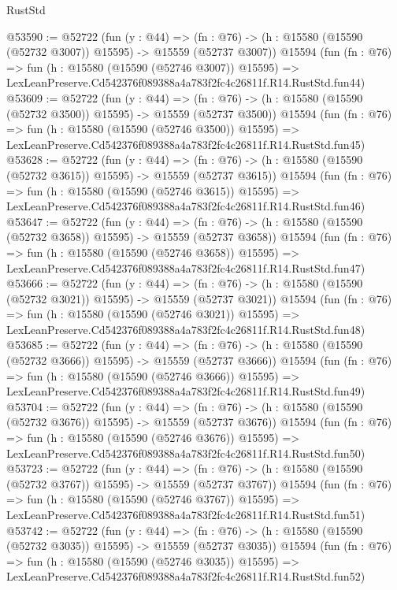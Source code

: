 \begin{lexlean}{RustStd}
\begin{coremodule}
@53590 := @52722
    (fun (y : @44) =>
    (fn : @76) -> (h : @15580 (@15590 (@52732 @3007)) @15595) -> @15559 (@52737 @3007))
    @15594
    (fun (fn : @76) =>
    fun (h : @15580 (@15590 (@52746 @3007)) @15595) =>
    LexLeanPreserve.Cd542376f089388a4a783f2fc4c26811f.R14.RustStd.fun44)
@53609 := @52722
    (fun (y : @44) =>
    (fn : @76) -> (h : @15580 (@15590 (@52732 @3500)) @15595) -> @15559 (@52737 @3500))
    @15594
    (fun (fn : @76) =>
    fun (h : @15580 (@15590 (@52746 @3500)) @15595) =>
    LexLeanPreserve.Cd542376f089388a4a783f2fc4c26811f.R14.RustStd.fun45)
@53628 := @52722
    (fun (y : @44) =>
    (fn : @76) -> (h : @15580 (@15590 (@52732 @3615)) @15595) -> @15559 (@52737 @3615))
    @15594
    (fun (fn : @76) =>
    fun (h : @15580 (@15590 (@52746 @3615)) @15595) =>
    LexLeanPreserve.Cd542376f089388a4a783f2fc4c26811f.R14.RustStd.fun46)
@53647 := @52722
    (fun (y : @44) =>
    (fn : @76) -> (h : @15580 (@15590 (@52732 @3658)) @15595) -> @15559 (@52737 @3658))
    @15594
    (fun (fn : @76) =>
    fun (h : @15580 (@15590 (@52746 @3658)) @15595) =>
    LexLeanPreserve.Cd542376f089388a4a783f2fc4c26811f.R14.RustStd.fun47)
@53666 := @52722
    (fun (y : @44) =>
    (fn : @76) -> (h : @15580 (@15590 (@52732 @3021)) @15595) -> @15559 (@52737 @3021))
    @15594
    (fun (fn : @76) =>
    fun (h : @15580 (@15590 (@52746 @3021)) @15595) =>
    LexLeanPreserve.Cd542376f089388a4a783f2fc4c26811f.R14.RustStd.fun48)
@53685 := @52722
    (fun (y : @44) =>
    (fn : @76) -> (h : @15580 (@15590 (@52732 @3666)) @15595) -> @15559 (@52737 @3666))
    @15594
    (fun (fn : @76) =>
    fun (h : @15580 (@15590 (@52746 @3666)) @15595) =>
    LexLeanPreserve.Cd542376f089388a4a783f2fc4c26811f.R14.RustStd.fun49)
@53704 := @52722
    (fun (y : @44) =>
    (fn : @76) -> (h : @15580 (@15590 (@52732 @3676)) @15595) -> @15559 (@52737 @3676))
    @15594
    (fun (fn : @76) =>
    fun (h : @15580 (@15590 (@52746 @3676)) @15595) =>
    LexLeanPreserve.Cd542376f089388a4a783f2fc4c26811f.R14.RustStd.fun50)
@53723 := @52722
    (fun (y : @44) =>
    (fn : @76) -> (h : @15580 (@15590 (@52732 @3767)) @15595) -> @15559 (@52737 @3767))
    @15594
    (fun (fn : @76) =>
    fun (h : @15580 (@15590 (@52746 @3767)) @15595) =>
    LexLeanPreserve.Cd542376f089388a4a783f2fc4c26811f.R14.RustStd.fun51)
@53742 := @52722
    (fun (y : @44) =>
    (fn : @76) -> (h : @15580 (@15590 (@52732 @3035)) @15595) -> @15559 (@52737 @3035))
    @15594
    (fun (fn : @76) =>
    fun (h : @15580 (@15590 (@52746 @3035)) @15595) =>
    LexLeanPreserve.Cd542376f089388a4a783f2fc4c26811f.R14.RustStd.fun52)

\end{coremodule}
\end{lexlean}
